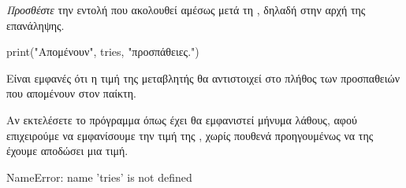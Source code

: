 \documentclass[a4paper,11pt,oneside]{book}
\begin{document}
\begin{step}
\label{step:tries-print}
\emph{Προσθέστε} την εντολή που ακολουθεί αμέσως μετά τη , δηλαδή στην αρχή της επανάληψης.

\begin{pynew}
print("Απομένουν", tries, "προσπάθειες.")
\end{pynew}

Είναι εμφανές ότι η τιμή της μεταβλητής  θα αντιστοιχεί στο πλήθος των προσπαθειών που απομένουν στον παίκτη. 

\marginnote[16pt]{\iconcaution}
Αν εκτελέσετε το πρόγραμμα όπως έχει θα εμφανιστεί μήνυμα λάθους, αφού επιχειρούμε να εμφανίσουμε την τιμή της , χωρίς πουθενά προηγουμένως να της έχουμε αποδώσει μια τιμή.

\marginnote[16pt]{\iconcomputer}
\begin{pyterm}
NameError: name 'tries' is not defined
\end{pyterm}
\end{step}
\end{document}
